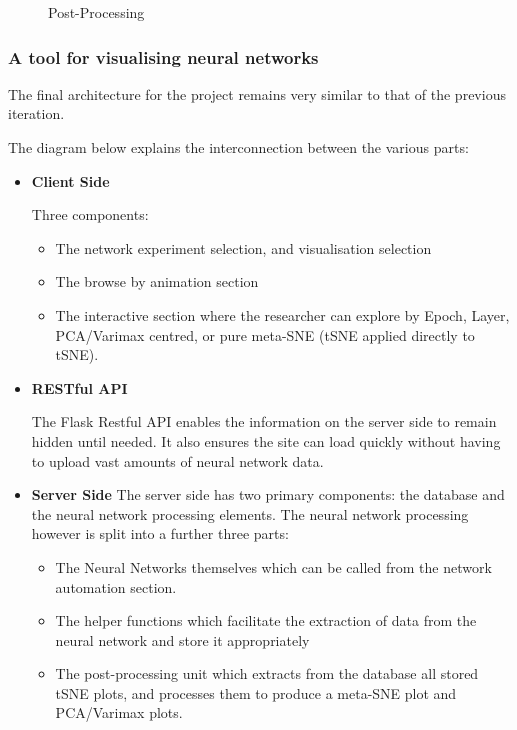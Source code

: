 \documentclass[a4paper,11pt,titlepage]{article}
\begin{document}
	\begin{figure}[H]
    			\caption{Post-Processing}%
	\end{figure}	
	
	
	\subsubsection{A tool for visualising neural networks}
	The final architecture for the project remains very similar to that of the previous iteration. 
	\par 
	The	diagram below explains the interconnection between the various parts:
	\begin{itemize}
		\item \textbf{Client Side}
			\par 
			Three components:
			\begin{itemize}
				\item The network experiment selection, and visualisation selection
				\item The browse by animation section
				\item The interactive section where the researcher can explore by Epoch, Layer, PCA/Varimax centred, or pure meta-SNE (tSNE applied directly to tSNE).
			\end{itemize}
		\item \textbf{RESTful API}	
			\par 
			The Flask Restful API enables the information on the server side to remain hidden until needed. It also ensures the site can load quickly without having to upload vast amounts of neural network data. 
		\item \textbf{Server Side}
			The server side has two primary components: the database and the neural network processing elements. The neural network processing however is split into a further three parts:
			\begin{itemize}
				\item The Neural Networks themselves which can be called from the network automation section.
				\item The helper functions which facilitate the extraction of data from the neural network and store it appropriately
				\item The post-processing unit which extracts from the database all stored tSNE plots, and processes them to produce a meta-SNE plot and PCA/Varimax plots.
			\end{itemize}
	\end{itemize}
	
\end{document}
